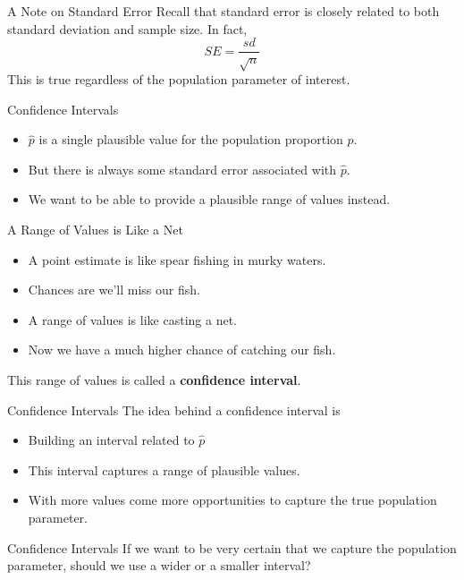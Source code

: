 \begin{frame}{A Note on Standard Error}
    Recall that standard error is closely related to both standard deviation and sample size. In fact,
    \[
        SE = \frac{sd}{\sqrt{n}}
    \]
    This is true regardless of the population parameter of interest.
\end{frame}

\begin{frame}{Confidence Intervals}
    \begin{itemize}
        \item $\hat{p}$ is a single plausible value for the population proportion $p$.
        \item But there is always some standard error associated with $\hat{p}$.
        \item We want to be able to provide a plausible range of values instead.
    \end{itemize}
\end{frame}

\begin{frame}{A Range of Values is Like a Net}
    \begin{itemize}
        \item A point estimate is like spear fishing in murky waters.
        \item Chances are we'll miss our fish.
        \item A range of values is like casting a net.
        \item Now we have a much higher chance of catching our fish.
    \end{itemize}
    This range of values is called a \textbf{confidence interval}.
\end{frame}

\begin{frame}{Confidence Intervals}
    The idea behind a confidence interval is
    \begin{itemize}
        \item Building an interval related to $\hat{p}$
        \item This interval captures a range of plausible values.
        \item With more values come more opportunities to capture the true population parameter.
    \end{itemize}
\end{frame}

\begin{frame}{Confidence Intervals}
    If we want to be very certain that we capture the population parameter, should we use a wider or a smaller interval?
\end{frame}

